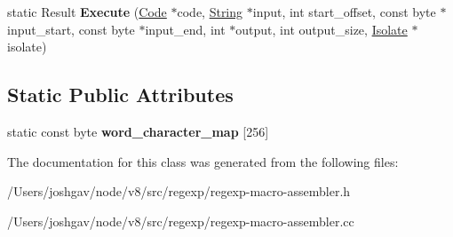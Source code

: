 \begin{DoxyCompactItemize}
\item 
static Result {\bfseries Execute} (\hyperlink{classv8_1_1internal_1_1_code}{Code} $\ast$code, \hyperlink{classv8_1_1internal_1_1_string}{String} $\ast$input, int start\+\_\+offset, const byte $\ast$input\+\_\+start, const byte $\ast$input\+\_\+end, int $\ast$output, int output\+\_\+size, \hyperlink{classv8_1_1internal_1_1_isolate}{Isolate} $\ast$isolate)\hypertarget{classv8_1_1internal_1_1_native_reg_exp_macro_assembler_acb1847e00b0dadbc2a75cba6baf1f192}{}\label{classv8_1_1internal_1_1_native_reg_exp_macro_assembler_acb1847e00b0dadbc2a75cba6baf1f192}

\end{DoxyCompactItemize}
\subsection*{Static Public Attributes}
\begin{DoxyCompactItemize}
\item 
static const byte {\bfseries word\+\_\+character\+\_\+map} \mbox{[}256\mbox{]}\hypertarget{classv8_1_1internal_1_1_native_reg_exp_macro_assembler_ab96e1f9e3bc1f9938a06183c0ebf1fca}{}\label{classv8_1_1internal_1_1_native_reg_exp_macro_assembler_ab96e1f9e3bc1f9938a06183c0ebf1fca}

\end{DoxyCompactItemize}


The documentation for this class was generated from the following files\+:\begin{DoxyCompactItemize}
\item 
/\+Users/joshgav/node/v8/src/regexp/regexp-\/macro-\/assembler.\+h\item 
/\+Users/joshgav/node/v8/src/regexp/regexp-\/macro-\/assembler.\+cc\end{DoxyCompactItemize}
